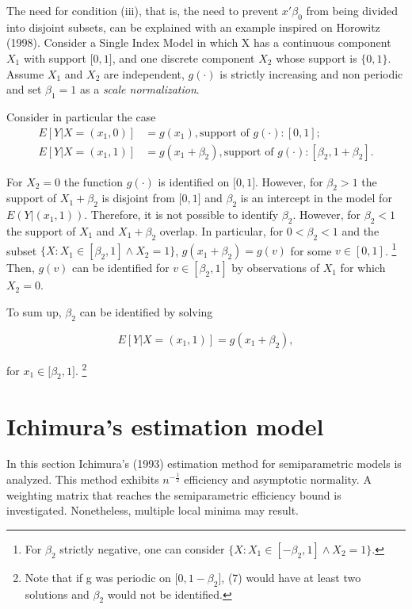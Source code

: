 \documentclass[a4paper]{article}
\begin{document}
The need for condition (iii), that is,  the need to prevent $x'\beta_0$  from being divided into disjoint subsets, can be explained with an example inspired on Horowitz (1998). Consider a Single Index Model in which X has a continuous component $X_1$ with support $\big[0,1\big]$, and one discrete component $X_2$ whose support is $\{0,1\}$. Assume $X_1$ and $X_2$ are independent, $g(\cdot)$ is strictly increasing and non periodic and set $\beta_1 = 1$ as a \textit{scale normalization}. 

Consider in particular the case
\[
\begin{split}
E[Y| X = (x_1,0)]& = g(x_1), \text{support\ of } g(\cdot): [0,1];  \\
E[Y| X = (x_1,1)]& = g(x_1+\beta_2), \text{support\ of } g(\cdot): [\beta_2,1+\beta_2].
\end{split}
\]

For $X_2 = 0$ the function $g(\cdot)$ is identified on $\big[0,1\big]$. However, for $\beta_2 > 1$ the support of $ X_1 + \beta_2$ is disjoint from $\big[0,1\big]$ and $\beta_2$ is an intercept in the model for $E(Y|(x_1,1))$. Therefore, it is not possible to identify $\beta_2$. However, for $\beta_2 < 1$ the support of $X_1$ and $X_1 + \beta_2$ overlap. In particular, for $0<\beta_2<1$  and the subset $\{X: X_1 \in [\beta_2, 1] \wedge X_2 = 1\}$, $g(x_1 + \beta_2) = g(v)$ for some $v \in [0,1]$. \footnote{For $\beta_2$ strictly negative, one can consider $\{X: X_1 \in [ - \beta_2, 1] \wedge X_2 = 1\}$.} Then, $g(v)$ can be identified for $v \in [\beta_2, 1]$ by observations of $X_1$ for which $X_2 = 0$. 

To sum up, $\beta_2$ can be identified by solving

\begin{equation}
E[Y| X = (x_1,1)] = g(x_1 + \beta_2),
\end{equation}

for $x_1 \in \big[\beta_2, 1\big]$. \footnote{Note that if g was periodic on $\big[0, 1 - \beta_2 \big]$, (7) would have at least two solutions and $\beta_2$ would not be identified.}


\section{Ichimura's estimation model} %
\label{sec:Ichimura's estimation model}

In this section Ichimura's (1993) estimation method for semiparametric models is analyzed. This method exhibits $n^{-\frac{1}{2}}$ efficiency and asymptotic normality. A weighting matrix that reaches the semiparametric efficiency bound is investigated. Nonetheless, multiple local minima may result. 
\end{document}
